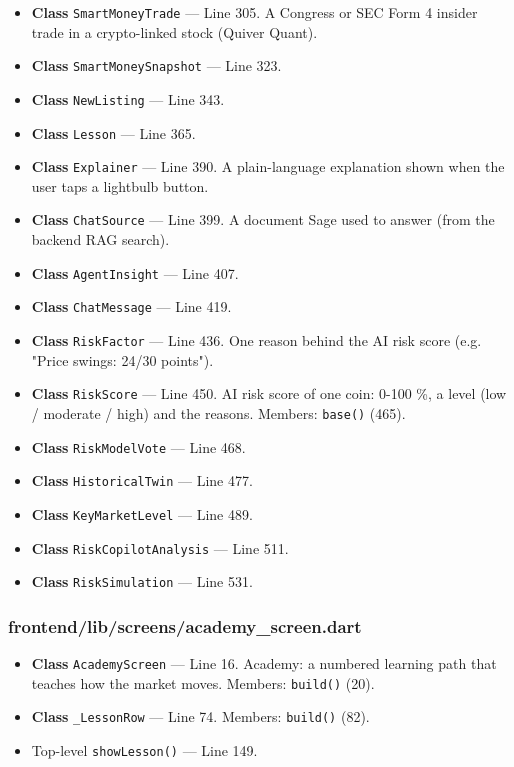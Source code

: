 \begin{itemize}[nosep,leftmargin=1.5em]
\item \textbf{Class} \texttt{SmartMoneyTrade} --- Line 305. A Congress or SEC Form 4 insider trade in a crypto-linked stock (Quiver Quant).
\item \textbf{Class} \texttt{SmartMoneySnapshot} --- Line 323.
\item \textbf{Class} \texttt{NewListing} --- Line 343.
\item \textbf{Class} \texttt{Lesson} --- Line 365.
\item \textbf{Class} \texttt{Explainer} --- Line 390. A plain-language explanation shown when the user taps a lightbulb button.
\item \textbf{Class} \texttt{ChatSource} --- Line 399. A document Sage used to answer (from the backend RAG search).
\item \textbf{Class} \texttt{AgentInsight} --- Line 407.
\item \textbf{Class} \texttt{ChatMessage} --- Line 419.
\item \textbf{Class} \texttt{RiskFactor} --- Line 436. One reason behind the AI risk score (e.g. "Price swings: 24/30 points").
\item \textbf{Class} \texttt{RiskScore} --- Line 450. AI risk score of one coin: 0-100 \%, a level (low / moderate / high) and the reasons. Members: \texttt{base(\allowbreak{})} (465).
\item \textbf{Class} \texttt{RiskModelVote} --- Line 468.
\item \textbf{Class} \texttt{HistoricalTwin} --- Line 477.
\item \textbf{Class} \texttt{KeyMarketLevel} --- Line 489.
\item \textbf{Class} \texttt{RiskCopilotAnalysis} --- Line 511.
\item \textbf{Class} \texttt{RiskSimulation} --- Line 531.
\end{itemize}
\subsubsection*{frontend/lib/screens/academy\_screen.dart}
\begin{itemize}[nosep,leftmargin=1.5em]
\item \textbf{Class} \texttt{AcademyScreen} --- Line 16. Academy: a numbered learning path that teaches how the market moves. Members: \texttt{build(\allowbreak{})} (20).
\item \textbf{Class} \texttt{\_\allowbreak{}LessonRow} --- Line 74. Members: \texttt{build(\allowbreak{})} (82).
\item Top-level \texttt{showLesson(\allowbreak{})} --- Line 149.
\end{itemize}
